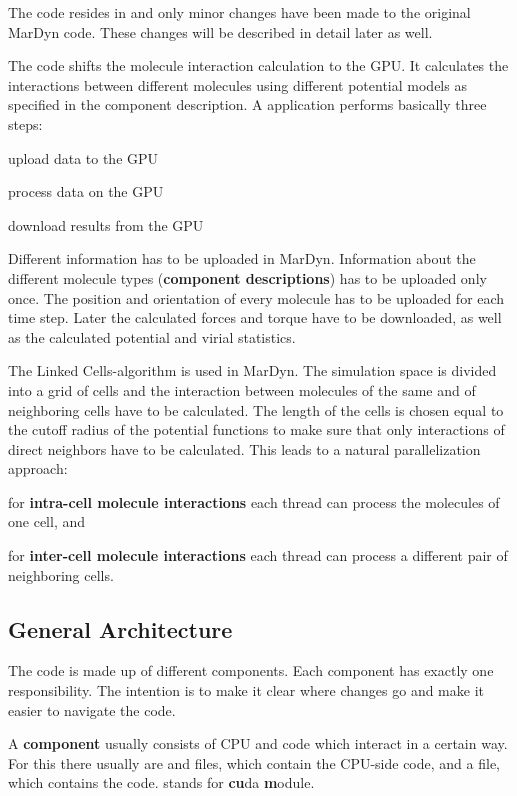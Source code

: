 The code resides in  and only minor changes have been made to the original MarDyn code. These changes will be described in detail later as well.

The \cuda{} code shifts the molecule interaction calculation to the GPU. It calculates the interactions between different molecules using different potential models as specified in the component description.
A \cuda{} application performs basically three steps:
\begin{compactenum}
\item upload data to the GPU
\item process data on the GPU
\item download results from the GPU
\end{compactenum} 
Different information has to be uploaded in MarDyn. Information about the different molecule types (\textbf{component descriptions}) has to be uploaded only once. The position and orientation of every molecule has to be uploaded for each time step. 
Later the calculated forces and torque have to be downloaded, as well as the calculated potential and virial statistics.

The Linked Cells-algorithm is used in MarDyn. The simulation space is divided into a grid of cells and the interaction between molecules of the same and of neighboring cells have to be calculated. The length of the cells is chosen equal to the cutoff radius of the potential functions to make sure that only interactions of direct neighbors have to be calculated.
This leads to a natural parallelization approach:
\begin{compactitem}
\item for \textbf{intra-cell molecule interactions} each thread can process the molecules of one cell, and
\item for \textbf{inter-cell molecule interactions} each thread can process a different pair of neighboring cells.
\end{compactitem}

\subsection{General Architecture}
The \cuda{} code is made up of different components. Each component has exactly one responsibility.
The intention is to make it clear where changes go and make it easier to navigate the code.

A \textbf{component} usually consists of CPU and \cuda{} code which interact in a certain way. For this there usually are  and  files, which contain the CPU-side code, and a  file, which contains the \cuda{} code.  stands for \textbf{cu}da \textbf{m}odule.

